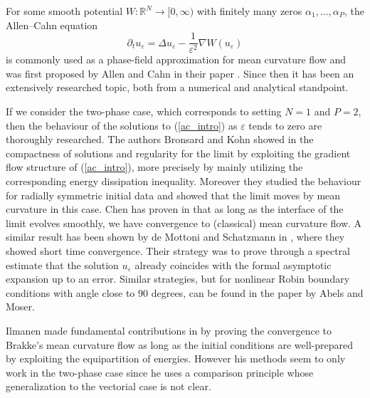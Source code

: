 For some smooth potential $ W 
\colon \mathbb{ R }^{ N } \to [ 0 , \infty ) $ with 
finitely many zeros $ \alpha_{ 1 } , \dotsc, \alpha_{ P } $, the Allen--Cahn 
equation
\begin{equation}
	\label{ac_intro}
	\partial_{ t } u_{ \varepsilon }
	=
	\Delta u_{ \varepsilon }
	-
	\frac{ 1 }{ \varepsilon^{ 2 } }
	\nabla W ( u_{ \varepsilon } )
\end{equation}
is commonly used as a phase-field approximation for mean curvature flow and was 
first proposed by Allen and Cahn in their paper 
\cite{allen_cahn_microscopig_theory_for_antiphase_boundary_motion}.
Since then it has been an extensively researched topic, both from a numerical 
and 
analytical standpoint. 

If we consider the two-phase case, which corresponds to setting $ N = 1 $ and $ 
P = 2 $, then 
the behaviour of the solutions to (\ref{ac_intro}) as $ \varepsilon $ tends to 
zero are thoroughly researched.
The authors Bronsard and Kohn showed in 
\cite{bronsard_kohn_motion_by_mean_curvature_as_singular_limit} the compactness 
of solutions and regularity for the limit by exploiting the gradient flow 
structure of (\ref{ac_intro}), more precisely by mainly utilizing the 
corresponding energy dissipation inequality. Moreover they studied the 
behaviour 
for radially symmetric initial data and showed that the limit moves by mean 
curvature in this 
case. 
Chen has proven in 
\cite{chen_generation_and_propagation_of_interfaces_for_reaction_diffusion_equations}
that as long as the interface of the limit evolves smoothly, we have 
convergence to (classical) mean curvature flow. 
A similar result has been shown 
by de Mottoni and Schatzmann in 
\cite{de_mottoni_schatzmann_geometrical_evolution_of_developed_interfaces}, 
where they showed short time convergence. Their strategy was to prove through a 
spectral estimate that the solution $ u_{ 
\varepsilon } $ already coincides with the formal asymptotic expansion up to an 
error. Similar strategies, but for nonlinear Robin 
boundary conditions with angle close to 90 degrees, can be found in the paper
\cite{abels_moser_convergence_of_ac_with_nonlinear_robin_boundary_condition_to_mcf}
by Abels and Moser.

Ilmanen made fundamental contributions in 
\cite{ilmanen_convergence_of_ac_to_brakkes_mcf} by proving the convergence to 
Brakke's mean curvature flow as long as the initial conditions are 
well-prepared by exploiting the equipartition of energies. However his methods 
seem to only work in the two-phase case since he uses a comparison principle 
whose generalization to the vectorial case is not clear.

